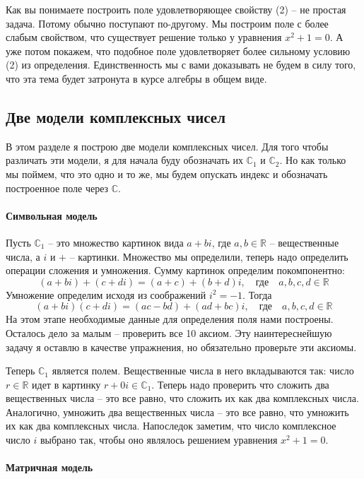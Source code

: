 Как вы понимаете построить поле удовлетворяющее свойству (2) -- не простая задача.
Потому обычно поступают по-другому.
Мы построим поле с более слабым свойством, что существует решение только у уравнения $x^2 + 1 = 0$.
А уже потом покажем, что подобное поле удовлетворяет более сильному условию (2) из определения.
Единственность мы с вами доказывать не будем в силу того, что эта тема будет затронута в курсе алгебры в общем виде.

\subsection{Две модели комплексных чисел}
\label{subsection::ComplexModels}

В этом разделе я построю две модели комплексных чисел.
Для того чтобы различать эти модели, я для начала буду обозначать их $\mathbb C_1$ и $\mathbb C_2$.
Но как только мы поймем, что это одно и то же, мы будем опускать индекс и обозначать построенное поле через $\mathbb C$.

\paragraph{Символьная модель}

Пусть $\mathbb C_1$ -- это множество картинок вида $a+bi$, где $a,b\in\mathbb R$ -- вещественные числа, а $i$ и $+$ -- картинки.
Множество мы определили, теперь надо определить операции сложения и умножения.
Сумму картинок определим покомпонентно:
\[
(a+bi) + (c+di) = (a+c) + (b+d) i, \quad\text{где}\quad a,b,c,d\in\mathbb R
\]
Умножение определим исходя из соображений $i^2 = -1$.
Тогда
\[
(a+bi)(c+di) = (ac - bd) + (ad + bc)i,\quad\text{где}\quad a,b,c,d\in\mathbb R
\]
На этом этапе необходимые данные для определения поля нами построены.
Осталось дело за малым -- проверить все 10 аксиом.
Эту наинтереснейшую задачу я оставлю в качестве упражнения, но обязательно проверьте эти аксиомы.

Теперь $\mathbb C_1$ является полем.
Вещественные числа в него вкладываются так: число $r\in\mathbb R$ идет в картинку $r + 0 i\in\mathbb C_1$.
Теперь надо проверить что сложить два вещественных числа -- это все равно, что сложить их как два комплексных числа.
Аналогично, умножить два вещественных числа -- это все равно, что умножить их как два комплексных числа.
Напоследок заметим, что число комплексное число $i$ выбрано так, чтобы оно являлось решением уравнения $x^2 + 1 = 0$.

\paragraph{Матричная модель}

